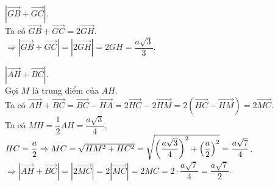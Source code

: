 \begin{bt}
{\begin{listEX}
{}
			\item[d)] $\left|\overrightarrow{GB}+\overrightarrow{GC}\right|$.\\
			Ta có $\overrightarrow{GB}+\overrightarrow{GC}=2\overrightarrow{GH}$.\\
			$\Rightarrow \left|\overrightarrow{GB}+\overrightarrow{GC}\right|=\left|2\overrightarrow{GH}\right|=2GH=\dfrac{a\sqrt{3}}{3}$.
			\item[e)] $\left|\overrightarrow{AH}+\overrightarrow{BC}\right|$.\\
			Gọi $M$ là trung điểm của $AH$.\\
			Ta có $\overrightarrow{AH}+\overrightarrow{BC}=\overrightarrow{BC}-\overrightarrow{HA}=2\overrightarrow{HC}-2\overrightarrow{HM}=2\left(\overrightarrow{HC}-\overrightarrow{HM}\right)=2\overrightarrow{MC}$.\\
			Ta có $MH=\dfrac{1}{2}AH=\dfrac{a\sqrt{3}}{4}$, $HC=\dfrac{a}{2}\\
			\Rightarrow MC=\sqrt{HM^2+HC^2}=\sqrt{\left(\dfrac{a\sqrt{3}}{4}\right)^2+\left(\dfrac{a}{2}\right)^2}=\dfrac{a\sqrt{7}}{4}$.\\
			$\Rightarrow \left|\overrightarrow{AH}+\overrightarrow{BC}\right|=\left|2\overrightarrow{MC}\right|=2\left|\overrightarrow{MC}\right|=2MC=2\cdot \dfrac{a\sqrt{7}}{4}=\dfrac{a\sqrt{7}}{2}$.
		\end{listEX}
	}
\end{bt}

